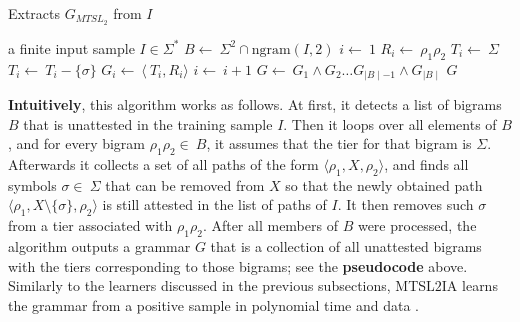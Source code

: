 \begin{algorithm}
\caption{Extracts $G_{MTSL_{2}}$ from $I$}
\begin{algorithmic}
\REQUIRE a finite input sample $I \in \Sigma^*$
\STATE $B \leftarrow~ \Sigma^2 \cap \textrm{ngram}(I, 2)$
\STATE $i \leftarrow~ 1$
	\STATE $R_i \leftarrow~ \rho_1\rho_2$
	\STATE $T_i \leftarrow~ \Sigma$
			\STATE $T_i \leftarrow~ T_i - \{\sigma\}$
		\ENDIF
	\ENDFOR
	\STATE $G_i \leftarrow~ \langle~ T_i, R_i \rangle$
	\STATE $i \leftarrow~ i+1$
\ENDFOR
\STATE $G \leftarrow~ G_1 \wedge G_2 \dots G_{\mid B\mid -1} \wedge G_{\mid B\mid}$
\RETURN $G$
\end{algorithmic}
\end{algorithm}

\textbf{Intuitively}, this algorithm works as follows.
At first, it detects a list of bigrams $B$ that is unattested in the training sample $I$.
Then it loops over all elements of $B$, and for every bigram $\rho_1\rho_2 \in~ B$, it assumes that the tier for that bigram is $\Sigma$.
Afterwards it collects a set of all paths of the form $\langle\rho_1, X, \rho_2\rangle$, and finds all symbols $\sigma \in~ \Sigma$ that can be removed from $X$ so that the newly obtained path $\langle\rho_1, X\setminus\{\sigma\}, \rho_2\rangle$ is still attested in the list of paths of $I$.
It then removes such $\sigma$ from a tier associated with $\rho_1\rho_2$.
After all members of $B$ were processed, the algorithm outputs a grammar $G$ that is a collection of all unattested bigrams with the tiers corresponding to those bigrams; see the \textbf{pseudocode} above.
Similarly to the learners discussed in the previous subsections, MTSL$2$IA learns the grammar from a positive sample in polynomial time and data \citep{McMullinAksenovaDeSanto2019}.

